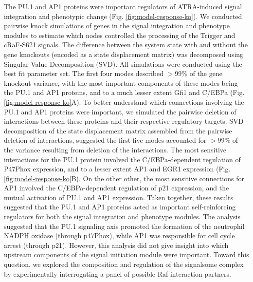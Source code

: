 \documentclass[12pt]{article}
\begin{document}
The PU.1 and AP1 proteins were important regulators of ATRA-induced signal integration and phenotypic change (Fig. \ref{fig:model-response-ko}).
We conducted pairwise knock simulations of genes in the signal integration and phenotype modules to estimate which nodes controlled the processing of the Trigger and cRaF-S621 signals.
The difference between the system state with and without the gene knockouts (encoded as a state displacement matrix) was decomposed using Singular Value Decomposition (SVD).
All simulations were conducted using the best fit parameter set.
The first four modes described $>$99\% of the gene knockout variance,
with the most important components of these modes being the PU.1 and AP1 proteins, and to a much lesser extent Gfi1 and C/EBPa (Fig. \ref{fig:model-response-ko}A).
To better understand which connections involving the PU.1 and AP1 proteins were important, we simulated the pairwise deletion of interactions between these proteins and their respective regulatory targets.
SVD decomposition of the state displacement matrix assembled from the pairwise deletion of interactions, suggested the first five modes accounted for $>$99\% of the variance resulting from deletion of the interactions.
The most sensitive interactions for the PU.1 protein involved the C/EBPa-dependent regulation of P47Phox expression, and to a lesser extent AP1 and EGR1 expression (Fig. \ref{fig:model-response-ko}B).
On the other other, the most sensitive connections for AP1 involved the C/EBPa-dependent regulation of p21 expression, and the mutual activation of PU.1 and AP1 expression.
Taken together, these results suggested that the PU.1 and AP1 proteins acted as important self-reinforcing regulators for both the signal integration and phenotype modules.
The analysis suggested that the PU.1 signaling axis promoted the formation of the neutrophil NADPH oxidase (through p47Phox), while AP1 was responsible for cell cycle arrest (through p21).
However, this analysis did not give insight into which upstream components of the signal initiation module were important.
Toward this question, we explored the composition and regulation of the signalsome complex by experimentally interrogating a panel of possible Raf interaction partners.
\end{document}
